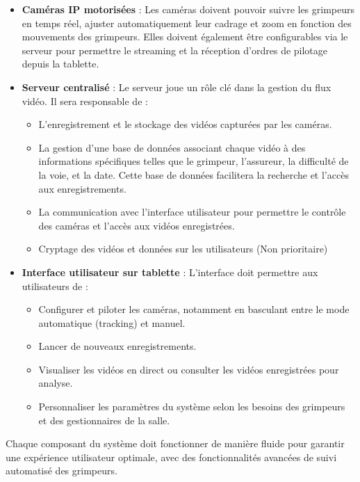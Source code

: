 \documentclass[a4paper, 11pt, french]{article}
\begin{document}
\begin{itemize}
    \item \textbf{Caméras IP motorisées} : Les caméras doivent pouvoir suivre les grimpeurs en temps réel, ajuster automatiquement leur cadrage et zoom en fonction des mouvements des grimpeurs. Elles doivent également être configurables via le serveur pour permettre le streaming et la réception d’ordres de pilotage depuis la tablette.
    
    \item \textbf{Serveur centralisé} : Le serveur joue un rôle clé dans la gestion du flux vidéo. Il sera responsable de :
    \begin{itemize}[label=$-$]
        \item L’enregistrement et le stockage des vidéos capturées par les caméras.
        \item La gestion d’une base de données associant chaque vidéo à des informations spécifiques telles que le grimpeur, l’assureur, la difficulté de la voie, et la date. Cette base de données facilitera la recherche et l’accès aux enregistrements.
        \item La communication avec l’interface utilisateur pour permettre le contrôle des caméras et l’accès aux vidéos enregistrées.
        \item Cryptage des vidéos et données sur les utilisateurs (Non prioritaire)
    \end{itemize}
    
    \item \textbf{Interface utilisateur sur tablette} : L’interface doit permettre aux utilisateurs de :
    \begin{itemize}
        \item Configurer et piloter les caméras, notamment en basculant entre le mode automatique (tracking) et manuel.
        \item Lancer de nouveaux enregistrements.
        \item Visualiser les vidéos en direct ou consulter les vidéos enregistrées pour analyse.
        \item Personnaliser les paramètres du système selon les besoins des grimpeurs et des gestionnaires de la salle.
    \end{itemize}
\end{itemize}

Chaque composant du système doit fonctionner de manière fluide pour garantir une expérience utilisateur optimale, avec des fonctionnalités avancées de suivi automatisé des grimpeurs.
\end{document}
